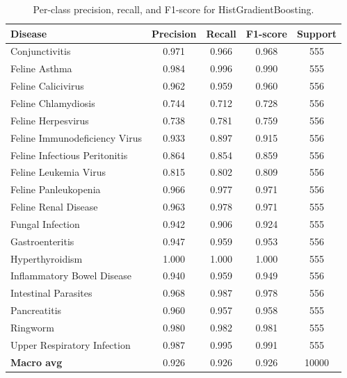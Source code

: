 \begin{table}[htbp]
\centering
\caption{Per-class precision, recall, and F1-score for HistGradientBoosting.}
\label{tab:per_class}
\begin{tabular}{lcccc}
\toprule
Disease & Precision & Recall & F1-score & Support \\
\midrule
Conjunctivitis & 0.971 & 0.966 & 0.968 & 555 \\
Feline Asthma & 0.984 & 0.996 & 0.990 & 555 \\
Feline Calicivirus & 0.962 & 0.959 & 0.960 & 556 \\
Feline Chlamydiosis & 0.744 & 0.712 & 0.728 & 556 \\
Feline Herpesvirus & 0.738 & 0.781 & 0.759 & 556 \\
Feline Immunodeficiency Virus & 0.933 & 0.897 & 0.915 & 556 \\
Feline Infectious Peritonitis & 0.864 & 0.854 & 0.859 & 556 \\
Feline Leukemia Virus & 0.815 & 0.802 & 0.809 & 556 \\
Feline Panleukopenia & 0.966 & 0.977 & 0.971 & 556 \\
Feline Renal Disease & 0.963 & 0.978 & 0.971 & 555 \\
Fungal Infection & 0.942 & 0.906 & 0.924 & 555 \\
Gastroenteritis & 0.947 & 0.959 & 0.953 & 556 \\
Hyperthyroidism & 1.000 & 1.000 & 1.000 & 555 \\
Inflammatory Bowel Disease & 0.940 & 0.959 & 0.949 & 556 \\
Intestinal Parasites & 0.968 & 0.987 & 0.978 & 556 \\
Pancreatitis & 0.960 & 0.957 & 0.958 & 555 \\
Ringworm & 0.980 & 0.982 & 0.981 & 555 \\
Upper Respiratory Infection & 0.987 & 0.995 & 0.991 & 555 \\
\midrule
\textbf{Macro avg} & 0.926 & 0.926 & 0.926 & 10000 \\
\bottomrule
\end{tabular}
\end{table}